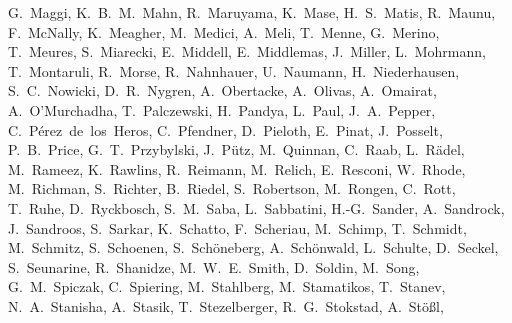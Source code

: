 \documentclass[manuscript]{aastex}
\begin{document}
{G.~Maggi,
K.~B.~M.~Mahn,
R.~Maruyama,
K.~Mase,
H.~S.~Matis,
R.~Maunu,
F.~McNally,
K.~Meagher,
M.~Medici,
A.~Meli,
T.~Menne,
G.~Merino,
T.~Meures,
S.~Miarecki,
E.~Middell,
E.~Middlemas,
J.~Miller,
L.~Mohrmann,
T.~Montaruli,
R.~Morse,
R.~Nahnhauer,
U.~Naumann,
H.~Niederhausen,
S.~C.~Nowicki,
D.~R.~Nygren,
A.~Obertacke,
A.~Olivas,
A.~Omairat,
A.~O'Murchadha,
T.~Palczewski,
H.~Pandya,
L.~Paul,
J.~A.~Pepper,
C.~P\'erez~de~los~Heros,
C.~Pfendner,
D.~Pieloth,
E.~Pinat,
J.~Posselt,
P.~B.~Price,
G.~T.~Przybylski,
J.~P\"utz,
M.~Quinnan,
C.~Raab,
L.~R\"adel,
M.~Rameez,
K.~Rawlins,
R.~Reimann,
M.~Relich,
E.~Resconi,
W.~Rhode,
M.~Richman,
S.~Richter,
B.~Riedel,
S.~Robertson,
M.~Rongen,
C.~Rott,
T.~Ruhe,
D.~Ryckbosch,
S.~M.~Saba,
L.~Sabbatini,
H.-G.~Sander,
A.~Sandrock,
J.~Sandroos,
S.~Sarkar,
K.~Schatto,
F.~Scheriau,
M.~Schimp,
T.~Schmidt,
M.~Schmitz,
S.~Schoenen,
S.~Sch\"oneberg,
A.~Sch\"onwald,
L.~Schulte,
D.~Seckel,
S.~Seunarine,
R.~Shanidze,
M.~W.~E.~Smith,
D.~Soldin,
M.~Song,
G.~M.~Spiczak,
C.~Spiering,
M.~Stahlberg,
M.~Stamatikos,
T.~Stanev,
N.~A.~Stanisha,
A.~Stasik,
T.~Stezelberger,
R.~G.~Stokstad,
A.~St\"o{\ss}l,
}
\end{document}
